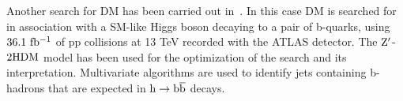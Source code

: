 \documentclass[10pt]{article}
\def\Acknowledgements{\bigskip  \bigskip \begin{center} \begin{large}
             \bf ACKNOWLEDGEMENTS \end{large}\end{center}}
\begin{document}
Another search for DM has been carried out in~\cite{ATLAS-bb-BSM}. In this case
DM is searched for in association with a SM-like Higgs boson decaying to a pair
of b-quarks, using $36.1~{\rm fb^{-1}}$ of pp collisions at 13 TeV recorded with
the ATLAS detector. The ${\rm Z'}$-${\rm 2HDM}$ model has been used for the
optimization of the search and its interpretation. Multivariate algorithms are
used to identify jets containing b-hadrons that are expected in
${\rm h}\to{\rm b{\bar b}}$ decays.




\end{document}
